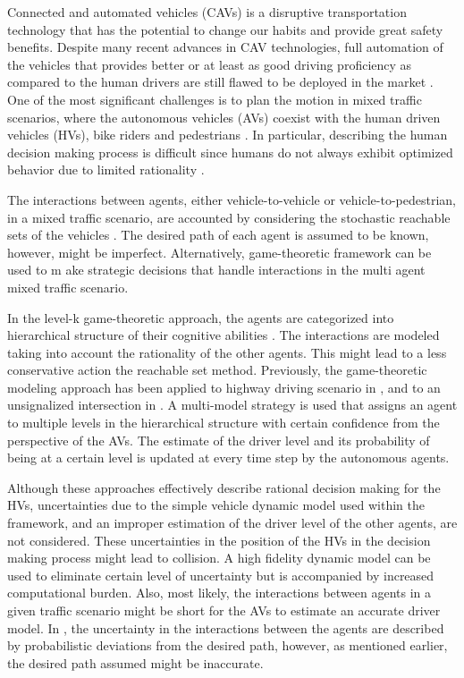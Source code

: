 \documentclass[10pt,journal]{IEEEtran}
\begin{document}
	Connected and automated vehicles (CAVs) is a disruptive transportation technology that has the potential to change our habits and provide great safety benefits. Despite many recent advances in CAV technologies, full automation of the vehicles that provides better or at least as good driving proficiency as compared to the human drivers are still flawed to be deployed in the market \cite{Okuda2014}. One of the most significant challenges is to plan the motion in mixed traffic scenarios, where the autonomous vehicles (AVs) coexist with the human driven vehicles (HVs), bike riders and pedestrians \cite{Lazar2018}. In particular, describing the human decision making process is difficult since humans do not always exhibit optimized behavior due to limited rationality \cite{Griffiths2015}.

	The interactions between agents, either vehicle-to-vehicle or vehicle-to-pedestrian, in a mixed traffic scenario, are accounted by considering the stochastic reachable sets of the vehicles \cite{Althoff2009}. The desired path of each agent is assumed to be known, however, might be imperfect. Alternatively, game-theoretic framework can be used to m ake strategic decisions that handle interactions in the multi agent mixed traffic scenario. 

	In the level-k game-theoretic approach, the agents are categorized into hierarchical structure of their cognitive abilities \cite{Stahl1993}. The interactions are modeled taking into account the rationality of the other agents. This might lead to a less conservative action the reachable set method. Previously, the game-theoretic modeling approach has been applied to highway driving scenario in \cite{Li2017}, and to an unsignalized intersection in \cite{Li2018, Tian2018}. A multi-model strategy is used that assigns an agent to multiple levels in the hierarchical structure  with certain confidence from the perspective of the AVs. The estimate of the driver level and its probability of being at a certain level is updated at every time step by the autonomous agents.
	
	Although these approaches effectively describe rational decision making for the HVs, uncertainties due to the simple vehicle dynamic model used within the framework, and an improper estimation of the driver level of the other agents, are not considered. These uncertainties in the position of the HVs in the decision making process might lead to collision. A high fidelity dynamic model can be used to eliminate certain level of uncertainty but is accompanied by increased computational burden. Also, most likely, the interactions between agents in a given traffic scenario might be short for the AVs to estimate an accurate driver model. In \cite{Althoff2009}, the uncertainty in the interactions between the agents are described by probabilistic deviations from the desired path, however, as mentioned earlier, the desired path assumed might be inaccurate. 
	
\end{document}
